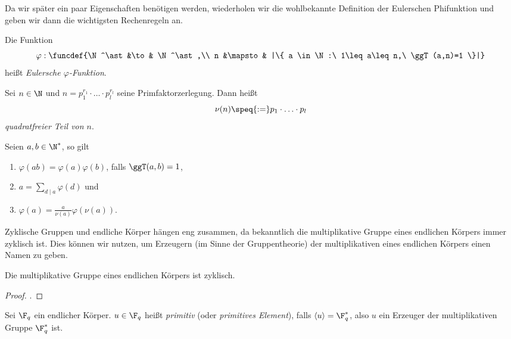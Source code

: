Da wir später ein paar Eigenschaften benötigen
werden, wiederholen wir die wohlbekannte Definition der Eulerschen
Phifunktion und geben wir dann die wichtigsten Rechenregeln an.


\begin{definition}
  Die Funktion
  \[ \varphi: \funcdef{\N^\ast &\to& \N^\ast,\\
    n &\mapsto& |\{ a \in \N:\ 1\leq a\leq n,\ \ggT(a,n)=1 \}|}\]
  heißt \emph{Eulersche $\varphi$-Funktion}.
\end{definition}

\begin{definition}
  Sei $n \in \N$ und $n = p_1^{r_1}\cdot\ldots\cdot p_l^{r_l}$ seine
  Primfaktorzerlegung. Dann heißt
  \[ \nu(n) \speq{:=} p_1\cdot \ldots\cdot p_l\]
  \emph{quadratfreier Teil von $n$}.
\end{definition}


\begin{lemma}
  \label{lemma:rechenregeln_phifunktion}
  Seien $a,b\in\N^\ast$, so gilt
  \begin{enumerate}
    \item $\varphi(ab) = \varphi(a)\varphi(b)$, falls $\ggT(a,b) = 1$,
    \item $a = \sum_{d\mid a} \varphi(d)$ und
    \item $\varphi(a) = \tfrac{a}{\nu(a)}\varphi(\nu(a))$.
  \end{enumerate}
\end{lemma}


Zyklische Gruppen und endliche Körper hängen eng zusammen, da bekanntlich die
multiplikative Gruppe eines endlichen Körpers immer zyklisch ist. Dies können
wir nutzen, um Erzeugern (im Sinne der Gruppentheorie) der multiplikativen
eines endlichen Körpers einen Namen zu geben.

\begin{satz}
  \label{satz:mult_gruppe_endl_korper_zyklisch}
  Die multiplikative Gruppe eines endlichen Körpers ist zyklisch.
\end{satz}
\begin{proof}
  \autocite[Theorem 2.8]{lidl1997finite}.
\end{proof}


\begin{definition}[primitiv]
  \label{def:primitiv}
  Sei $\F_q$ ein endlicher Körper. $u\in \F_q$ heißt \emph{primitiv} 
  (oder \emph{primitives Element}), falls $\langle u \rangle = \F_q^\ast$, 
  also $u$ ein Erzeuger der multiplikativen Gruppe $\F_q^\ast$ ist.
\end{definition}


